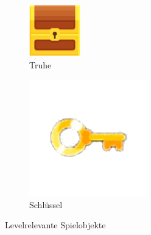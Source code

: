 \begin{figure}[H]
    \centering
    \begin{subfigure}[H]{0.15\textwidth}
        \includegraphics[width=\textwidth]{img/realisierung/assets/chest}
        \caption{Truhe}
        \label{fig:truhe}
    \end{subfigure}
    \qquad
    \begin{subfigure}[H]{0.15\textwidth}
        \includegraphics[width=\textwidth]{img/realisierung/assets/key}
        \caption{Schlüssel}
        \label{fig:schluessel}
    \end{subfigure}
    \caption{Levelrelevante Spielobjekte}
    \label{fig:keyandchest}
\end{figure}

